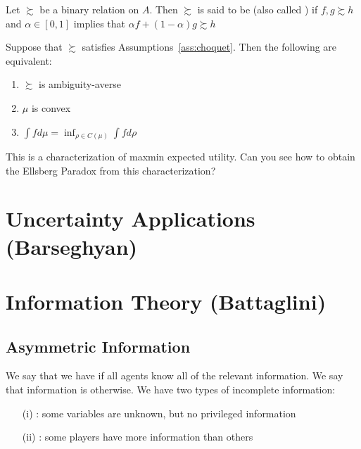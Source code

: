 \documentclass[12pt]{article}
\begin{document}
\begin{definition}
	Let $\succsim$ be a binary relation on $A$. Then $\succsim$ is said to be  (also called ) if $f,g \succsim h$ and $\alpha \in [0,1]$ implies that $\alpha f + (1-\alpha)g \succsim h$
\end{definition}

\begin{theorem}
	Suppose that $\succsim$ satisfies Assumptions~\ref{ass:choquet}. Then the following are equivalent:
	\begin{enumerate}
		\item $\succsim$ is ambiguity-averse
		\item $\mu$ is convex
		\item $\int f d\mu = \inf_{\rho \in C(\mu)} \int f d\rho$
	\end{enumerate}
\end{theorem}
\begin{remark}
	This is a characterization of maxmin expected utility. Can you see how to obtain the Ellsberg Paradox from this characterization?
\end{remark}







\newpage
\section{Uncertainty Applications (Barseghyan)}\label{sec:barseghyan}

\newpage
\section{Information Theory (Battaglini)}\label{sec:battaglini}

\subsection{Asymmetric Information}

\begin{definition}
	We say that we have  if all agents know all of the relevant information. We say that information is  otherwise. We have two types of incomplete information:
	\begin{itemize}
		\item[(i)] : some variables are unknown, but no privileged information
		\item[(ii)] : some players have more information than others
	\end{itemize}
\end{definition}
\end{document}
